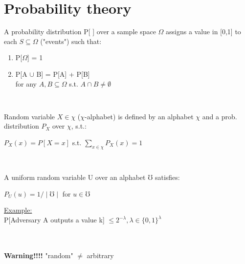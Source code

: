 \documentclass{report}
\begin{document}
 \section{Probability theory}
 \begin{compactenum}[$\star$]
 	\item A probability distribution P[ ] over a sample space $\Omega$ assigns a value in [0,1] to each $S \subseteq \Omega $ ("events") such that:
 	\begin{enumerate}
 		\item P[$\Omega$] = 1
 		\item P[A $\cup$ B] = P[A] + P[B] \\
 		for any $A,B\subseteq \Omega$ s.t. $A \cap B \neq \emptyset$
 	\end{enumerate}
 	\hfill \\
 	\item Random variable $X \in \chi$ ($\chi$-alphabet) is defined by an alphabet $\chi$ and a prob. distribution $P_X$ over $\chi$, s.t.:
 	\begin{center}
 		$P_X (x) = P[X=x]$ s.t. $\sum_{x\in \chi} P_X(x) = 1$
 	\end{center}
 	\hfill \\
 	\item A uniform random variable U over an alphabet $\mho$ satisfies:
 	\begin{center}
 		$P_U(u) = 1/\mid \mho \mid$ for $u \in \mho$
 	\end{center}
 	\underline{Example:} \\
 	P[Adversary A outputs a value k] $\leq 2^{-\lambda}, \lambda \in \{0,1\}^{\lambda}$
 \end{compactenum}
 \hfill \\ \\
 \textbf{Warning!!!!} "random" $\neq$ arbitrary \\
 
 \newpage
 
\end{document}
